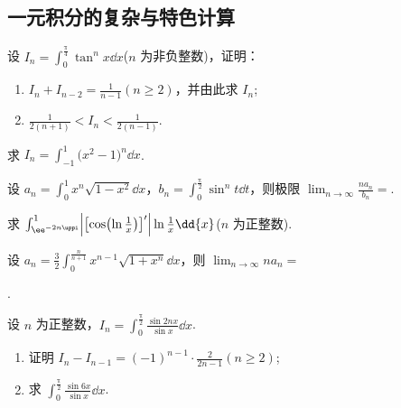 \subsection{一元积分的复杂与特色计算}

	\begin{ti}
		设 $I_{n} = \int_{0}^{\frac{\uppi}{4}} \tan^{n}x \dd{x}$($n$ 为非负整数)，证明：
		\begin{enumerate}
			\item $I_{n} + I_{n-2} = \frac{1}{n - 1} (n \geq 2)$，并由此求 $I_{n}$;
			\item $\frac{1}{2(n + 1)} < I_{n} < \frac{1}{2(n - 1)}$.
		\end{enumerate}
	\end{ti}

	\begin{ti}
		求 $I_{n} = \int_{-1}^{1} \bigl( x^{2} - 1 \bigr)^{n} \dd{x}$.
	\end{ti}

	\begin{ti}
		设 $a_{n} = \int_{0}^{1} x^{n} \sqrt{1 - x^{2}} \dd{x}$，$b_{n} = \int_{0}^{\frac{\uppi}{2}} \sin^{n}t \dd{t}$，则极限 $\lim_{n \to \infty} \frac{n a_{n}}{b_{n}} = $\kuo.

	\end{ti}

	\begin{ti}
		求 $\int_{\ee^{-2 n \uppi}}^{1} \Bigl| \bigl[ \cos \bigl( \ln \frac{1}{x} \bigr) \bigr]' \Bigr| \ln \frac{1}{x} \dd{x}$($n$ 为正整数).
	\end{ti}

	\begin{ti}
		设 $a_{n} = \frac{3}{2} \int_{0}^{\frac{n}{n + 1}} x^{n-1} \sqrt{1 + x^{n}} \dd{x}$，则 $\lim_{n \to \infty} n a_{n} = $\hone{1.2}
		
		\noindent\hone{2.8}.
	\end{ti}

	\begin{ti}
		设 $n$ 为正整数，$I_{n} = \int_{0}^{\frac{\uppi}{2}} \frac{\sin 2nx}{\sin x} \dd{x}$.
		\begin{enumerate}
			\item 证明 $I_{n} - I_{n-1} = (-1)^{n-1} \cdot \frac{2}{2n-1} (n \geq 2)$;
			\item 求 $\int_{0}^{\frac{\uppi}{2}} \frac{\sin 6x}{\sin x} \dd{x}$.
		\end{enumerate}
	\end{ti}

